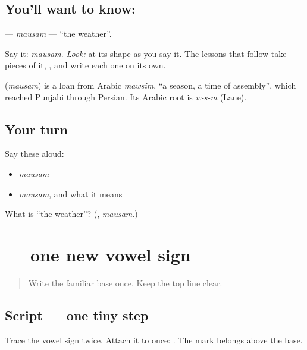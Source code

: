 \subsection*{You'll want to know: }
\textbf{} — \emph{mausam} — \textquotedblleft{}the weather\textquotedblright{}.

Say it: \emph{mausam}. \emph{Look:} at its shape as you say it. The lessons that follow take pieces of it, \textbf{}, and write each one on its own.

\begin{cousinweb}
\textbf{} (\emph{mausam}) is a loan from Arabic \emph{mawsim}, \textquotedblleft{}a season, a time of assembly\textquotedblright{}, which reached Punjabi through Persian. Its Arabic root is \emph{w-s-m} (Lane).
\end{cousinweb}

\subsection*{Your turn}
Say these aloud:

\begin{itemize}
\raggedright
  \item \emph{mausam}
  \item \emph{mausam}, and what it means
\end{itemize}

\begin{tcolorbox}[breakable,colback=teal!4,colframe=teal!35!black,title={Before you move on}]
What is \textquotedblleft{}the weather\textquotedblright{}? (\textbf{}, \emph{mausam}.)
\end{tcolorbox}
\section[\texorpdfstring{\pa{ੌ} (au-matra)}{ੌ (au-matra)}]{ — one new vowel sign}

\label{lesson:PA-W05-au-matra}



\begin{quote}
Write the familiar base \textbf{} once. Keep the top line clear.
\end{quote}

\subsection*{Script — one tiny step}
Trace the vowel sign \textbf{} twice. Attach it to \textbf{} once: \textbf{}. The mark belongs above the base.

